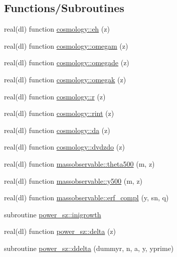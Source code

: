 \subsection*{Functions/\+Subroutines}
\begin{DoxyCompactItemize}
\item 
real(dl) function \mbox{\hyperlink{namespacecosmology_af6e96fd519aaf76a5407429172288537}{cosmology\+::eh}} (z)
\item 
real(dl) function \mbox{\hyperlink{namespacecosmology_aeef992799f00205f3a31ac86d34da7e2}{cosmology\+::omegam}} (z)
\item 
real(dl) function \mbox{\hyperlink{namespacecosmology_a81af36db5e915a16bc6684c70562c2cc}{cosmology\+::omegade}} (z)
\item 
real(dl) function \mbox{\hyperlink{namespacecosmology_ac8a5367c45bf7773b9a8e27fb7ff59ec}{cosmology\+::omegak}} (z)
\item 
real(dl) function \mbox{\hyperlink{namespacecosmology_a5acb8c4886ff7017542c3c1ec551f357}{cosmology\+::r}} (z)
\item 
real(dl) function \mbox{\hyperlink{namespacecosmology_a9203d5591635fce503b42a2121a1dfaa}{cosmology\+::rint}} (z)
\item 
real(dl) function \mbox{\hyperlink{namespacecosmology_a17233f8902b8f4b3f66ff1bfb3406c05}{cosmology\+::da}} (z)
\item 
real(dl) function \mbox{\hyperlink{namespacecosmology_a38a12dc082adc18d1fc8a043bd39405c}{cosmology\+::dvdzdo}} (z)
\item 
real(dl) function \mbox{\hyperlink{namespacemassobservable_a4be614d859b3c2e06a7674a7af153ff5}{massobservable\+::theta500}} (m, z)
\item 
real(dl) function \mbox{\hyperlink{namespacemassobservable_a4eca145d43dd43892e21b73f42ace63e}{massobservable\+::y500}} (m, z)
\item 
real(dl) function \mbox{\hyperlink{namespacemassobservable_ac95513e74fbf07c2becffe8985dfc31b}{massobservable\+::erf\+\_\+compl}} (y, sn, q)
\item 
subroutine \mbox{\hyperlink{namespacepower__sz_aba87ceb74647bba3404b96101f438d35}{power\+\_\+sz\+::inigrowth}}
\item 
real(dl) function \mbox{\hyperlink{namespacepower__sz_aa30236046bbf63ea0304f440bef4964d}{power\+\_\+sz\+::delta}} (z)
\item 
subroutine \mbox{\hyperlink{namespacepower__sz_adf64f1eb16e70afa359a6b084d2219d4}{power\+\_\+sz\+::ddelta}} (dummyr, n, a, y, yprime)
\item 

\end{DoxyCompactItemize}
